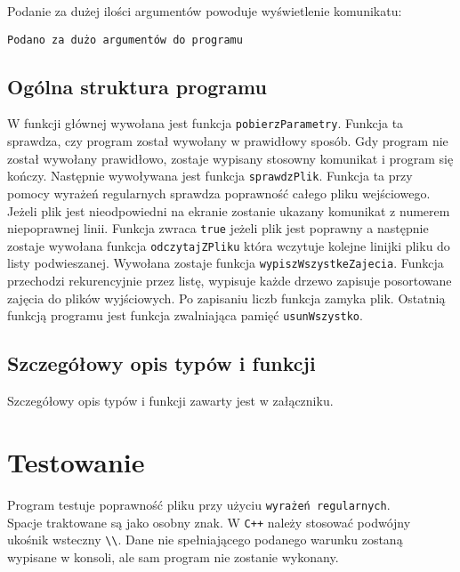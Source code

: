 \documentclass[12pt,a4paper,oneside]{article}
\let\oldmarginpar\marginpar
\renewcommand\marginpar[1]{%
  {\linespread{0.85}\normalfont\scriptsize%
\oldmarginpar[\hspace{1cm}\begin{minipage}{3cm}\raggedleft\scriptsize\color{black}\textsf{#1}\end{minipage}]%
{\hspace{0cm}\begin{minipage}{3cm}\raggedright\scriptsize\color{black}\textsf{#1}\end{minipage}}%
}%
}
\begin{document}
Podanie za dużej ilości argumentów powoduje wyświetlenie komunikatu:
\begin{verbatim}
Podano za dużo argumentów do programu
\end{verbatim}




\subsection{Ogólna struktura programu}
\marginpar{}
W funkcji głównej wywołana jest funkcja \lstinline|pobierzParametry|.
Funkcja ta sprawdza, czy program został wywołany w prawidłowy sposób. Gdy program nie został wywołany prawidłowo, zostaje wypisany stosowny komunikat i program się kończy.
Następnie wywoływana jest funkcja \lstinline|sprawdzPlik|.
Funkcja ta przy pomocy wyrażeń regularnych sprawdza poprawność całego pliku wejściowego. Jeżeli plik jest nieodpowiedni na ekranie zostanie ukazany komunikat z numerem niepoprawnej linii.
Funkcja zwraca \texttt{true} jeżeli plik jest poprawny a następnie zostaje wywołana funkcja \lstinline|odczytajZPliku| która wczytuje kolejne linijki pliku do listy podwieszanej.
Wywołana zostaje funkcja \lstinline|wypiszWszystkeZajecia|.
Funkcja przechodzi rekurencyjnie przez listę, wypisuje każde drzewo zapisuje posortowane zajęcia do plików wyjściowych. Po zapisaniu liczb funkcja zamyka plik. 
Ostatnią funkcją programu jest funkcja zwalniająca pamięć \lstinline|usunWszystko|.


\subsection{Szczegółowy opis typów i funkcji}

Szczegółowy opis typów i funkcji zawarty jest w załączniku. 

\section{Testowanie}
\marginpar{}

Program testuje poprawność pliku przy użyciu \texttt{wyrażeń regularnych}. \\
Spacje traktowane są jako osobny znak. W \texttt{C++} należy stosować podwójny ukośnik wsteczny \lstinline|\\|. Dane nie spełniającego podanego warunku zostaną wypisane w konsoli, ale sam program nie zostanie wykonany. \newline \newline
\noindent {}
\newline
\end{document}
